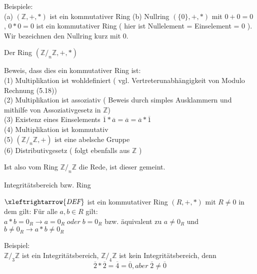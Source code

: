 \documentclass[headsepline,12pt,a4paper]{scrartcl}
\begin{document}
\item Beispiele: \\
(a) $ (\mathbb{Z},+,*) $ ist ein kommutativer Ring 
(b) Nullring $ ( \{0\}, +, * ) $ mit $0+0 = 0$ ,  $0*0=0$ ist ein kommutativer Ring ( hier ist Nullelement = Einselement = 0 ). Wir bezeichnen den Nullring kurz mit 0.

\begin{center}
\item[ Der Ring $ ( \mathbb{Z}/_n \mathbb{Z} , +, * ) $]
\end{center}
\item Beweis, dass dies ein kommutativer Ring ist:\\
(1) Multiplikation ist wohldefiniert ( vgl. Vertreterunabhängigkeit von Modulo Rechnung (5.18)) \\
(2) Multiplikation ist assoziativ ( Beweis durch simples Ausklammern und mithilfe von Assoziativgesetz in $\mathbb{Z}$) \\
(3) Existenz eines Einselements $ \overline{1} * \overline{a} = \overline{a} =  \overline{a} * \overline{1} $\\
(4) Multiplikation ist kommutativ \\
(5)  $ ( \mathbb{Z}/_n \mathbb{Z} , + ) $ ist eine abelsche Gruppe \\
(6) Distributivgesetz ( folgt ebenfalls aus $\mathbb{Z}$ ) \\
\item Ist also vom Ring $ \mathbb{Z}/_n \mathbb{Z} $ die Rede, ist dieser gemeint.

\begin{center}
\item[ Integritätsbereich bzw. Ring ]
\end{center}
\item $\xleftrightarrow{\textit{DEF}}$ ist ein kommutativer Ring $(R,+,*)$ mit $R\neq 0$ in dem gilt: Für alle $a,b \in R $ gilt: \\
$a*b = 0_R \rightarrow a = 0_R \; \textit{oder} \;   b = 0_R $ bzw. äquivalent zu $ a \neq 0_R $ und $ b \neq 0_R \rightarrow a*b \neq 0_R $ \\
\item Beispiel: \\
$ \mathbb{Z}/_3 \mathbb{Z} $ ist ein Integritätsbereich,  $ \mathbb{Z}/_4 \mathbb{Z} $ ist kein Integritätsbereich, denn \\
$$ \overline{2} * \overline{2} = \overline{4} = \overline{0} , \textit{aber} \; \overline{2} \neq \overline{0} $$ 
\end{document}
